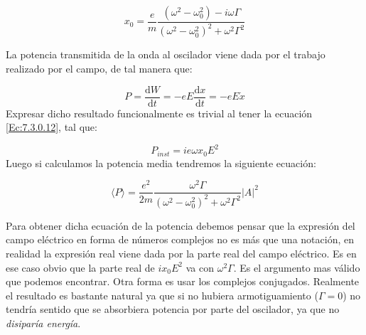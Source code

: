 \documentclass[12pt]{article}
\newcommand{\D}{\mathrm{d}}
\numberwithin{equation}{section}
\numberwithin{figure}{section}
\begin{document}
\begin{equation}
x_0 = \dfrac{e}{m} \dfrac{( \omega^2 - \omega_0^2)-i \omega \Gamma}{(\omega^2-\omega_0^2)^2 + \omega^2 \Gamma^2}
\end{equation}

La potencia transmitida de la onda al oscilador viene dada por el trabajo realizado por el campo, de tal manera que:

\begin{equation}
P = \dfrac{\D W}{\D t} = -  e E  \dfrac{\D x}{\D t} = - e E \dot{x}
\end{equation} 
Expresar dicho resultado funcionalmente es trivial al tener la ecuación \ref{Ec:7.3.0.12}, tal que:

\begin{equation}
P_{inst} = i e \omega x_0  E^2 
\end{equation}
Luego si calculamos la potencia media tendremos la siguiente ecuación:





\begin{equation}
\langle P \rangle = \dfrac{e^2}{2m} \dfrac{\omega^2 \Gamma}{(\omega^2 - \omega_0^2)^2 + \omega^2 \Gamma^2} |A|^2 
\end{equation}

Para obtener dicha ecuación de la potencia debemos pensar que la expresión del campo eléctrico en forma de números complejos no es más que una notación, en realidad la expresión real viene dada por la parte real del campo eléctrico. Es en ese caso obvio que la parte real de $ix_0E^2$ va con $\omega^2 \Gamma$. Es el argumento mas válido que podemos encontrar. Otra forma es usar los complejos conjugados. Realmente el resultado es bastante natural ya que si no hubiera armotiguamiento ($\Gamma = 0$) no tendría sentido que se absorbiera potencia por parte del oscilador, ya que no \textit{disiparía energía}. \\
\end{document}
